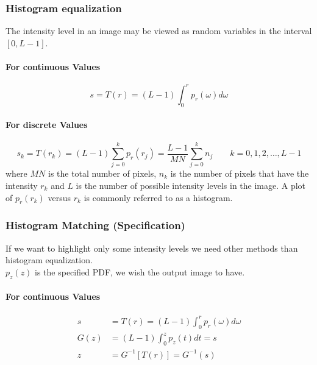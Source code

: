 \subsubsection{Histogram equalization }
The intensity level in an image may be viewed as random variables in the interval $[0, L-1]$.

\paragraph{For continuous Values}
\begin{equation}
	s = T(r) = (L-1)\int_0^r p_r(\omega) d\omega
\end{equation} 

\paragraph{For discrete Values}
\begin{equation}
	s_k = T(r_k) = (L-1) \sum_{j=0}^k p_r(r_j) = \frac{L-1}{MN} \sum_{j=0}^k n_j \qquad k = 0,1,2,\ldots, L-1
\end{equation}
where $MN$ is the total number of pixels, $n_k$ is the number of pixels that have the intensity $r_k$ and $L$ is the number of possible intensity levels in the image.
A plot of $p_r(r_k)$ versus $r_k$ is commonly referred to as a histogram.

\newpage

\subsubsection{Histogram Matching (Specification) }
If we want to highlight only some intensity levels we need other methods than histogram equalization. \\
$p_z(z)$ is the specified PDF, we wish the output image to have.

\paragraph{For continuous Values}
\begin{align}
	s	&= T(r) = (L-1) \int_0^r p_r(\omega) d\omega \label{eq:histmatch:cont1} \\
	G(z)&= (L-1) \int_0^z p_z(t) dt = s \label{eq:histmatch:cont2} \\
	z 	&= G^{-1}[T(r)] = G^{-1}(s) \label{eq:histmatch:cont3}
\end{align}

